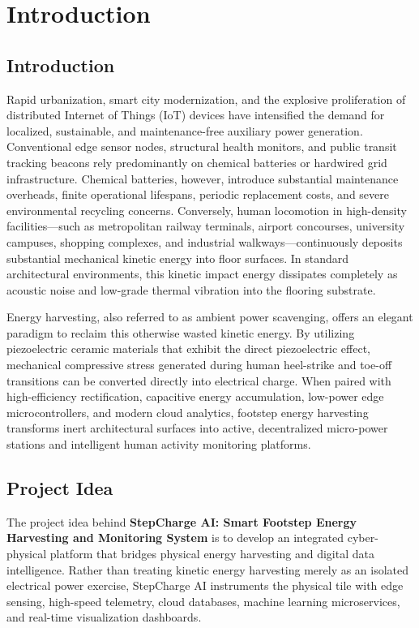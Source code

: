 \chapter{Introduction}

\section{Introduction}
Rapid urbanization, smart city modernization, and the explosive proliferation of distributed Internet of Things (IoT) devices have intensified the demand for localized, sustainable, and maintenance-free auxiliary power generation. Conventional edge sensor nodes, structural health monitors, and public transit tracking beacons rely predominantly on chemical batteries or hardwired grid infrastructure. Chemical batteries, however, introduce substantial maintenance overheads, finite operational lifespans, periodic replacement costs, and severe environmental recycling concerns. Conversely, human locomotion in high-density facilities---such as metropolitan railway terminals, airport concourses, university campuses, shopping complexes, and industrial walkways---continuously deposits substantial mechanical kinetic energy into floor surfaces. In standard architectural environments, this kinetic impact energy dissipates completely as acoustic noise and low-grade thermal vibration into the flooring substrate.

Energy harvesting, also referred to as ambient power scavenging, offers an elegant paradigm to reclaim this otherwise wasted kinetic energy. By utilizing piezoelectric ceramic materials that exhibit the direct piezoelectric effect, mechanical compressive stress generated during human heel-strike and toe-off transitions can be converted directly into electrical charge. When paired with high-efficiency rectification, capacitive energy accumulation, low-power edge microcontrollers, and modern cloud analytics, footstep energy harvesting transforms inert architectural surfaces into active, decentralized micro-power stations and intelligent human activity monitoring platforms.

\section{Project Idea}
The project idea behind \textbf{StepCharge AI: Smart Footstep Energy Harvesting and Monitoring System} is to develop an integrated cyber-physical platform that bridges physical energy harvesting and digital data intelligence. Rather than treating kinetic energy harvesting merely as an isolated electrical power exercise, StepCharge AI instruments the physical tile with edge sensing, high-speed telemetry, cloud databases, machine learning microservices, and real-time visualization dashboards. 

